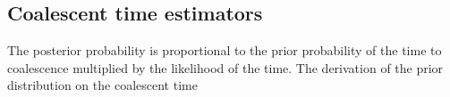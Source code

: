 

%
\subsection{Coalescent time estimators}\label{sec:tmrca_clocks}
%


%
%
%
%


The posterior probability is proportional to the prior probability of the time to coalescence multiplied by the likelihood of the time.
The derivation of the prior distribution on the coalescent time 

